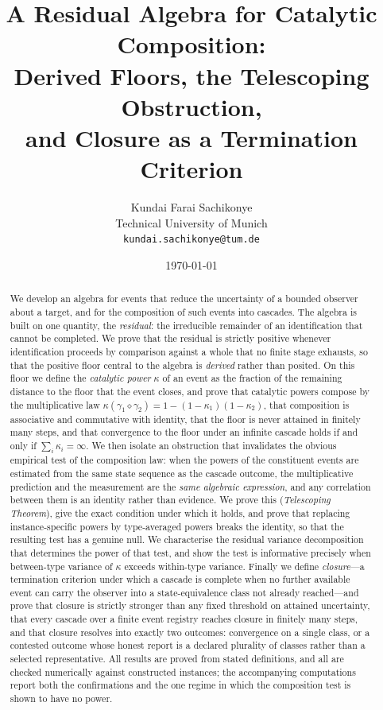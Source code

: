 \documentclass[11pt,a4paper]{article}
\title{\textbf{A Residual Algebra for Catalytic Composition:\\[2pt]
Derived Floors, the Telescoping Obstruction,\\
and Closure as a Termination Criterion}}
\author{%
Kundai Farai Sachikonye\\
\small Technical University of Munich\\
\small \texttt{kundai.sachikonye@tum.de}}
\date{\today}
\theoremstyle{thmstyle}
\theoremstyle{definition}
\theoremstyle{remark}
\newcommand{\kap}{\kappa}
\newcommand{\comp}{\diamond}
\begin{document}
\maketitle

\begin{abstract}
\noindent
We develop an algebra for events that reduce the uncertainty of a bounded
observer about a target, and for the composition of such events into
cascades. The algebra is built on one quantity, the \emph{residual}: the
irreducible remainder of an identification that cannot be completed. We
prove that the residual is strictly positive whenever identification proceeds
by comparison against a whole that no finite stage exhausts, so that the
positive floor central to the algebra is \emph{derived} rather than posited.
On this floor we define the \emph{catalytic power} $\kap$ of an event as the
fraction of the remaining distance to the floor that the event closes, and
prove that catalytic powers compose by the multiplicative law
$\kap(\gamma_1\comp\gamma_2)=1-(1-\kap_1)(1-\kap_2)$, that composition is
associative and commutative with identity, that the floor is never attained
in finitely many steps, and that convergence to the floor under an infinite
cascade holds if and only if $\sum_i\kap_i=\infty$. We then isolate an
obstruction that invalidates the obvious empirical test of the composition
law: when the powers of the constituent events are estimated from the same
state sequence as the cascade outcome, the multiplicative prediction and the
measurement are the \emph{same algebraic expression}, and any correlation
between them is an identity rather than evidence. We prove this
(\emph{Telescoping Theorem}), give the exact condition under which it holds,
and prove that replacing instance-specific powers by type-averaged powers
breaks the identity, so that the resulting test has a genuine null. We
characterise the residual variance decomposition that determines the power of
that test, and show the test is informative precisely when between-type
variance of $\kap$ exceeds within-type variance. Finally we define
\emph{closure}---a termination criterion under which a cascade is complete
when no further available event can carry the observer into a
state-equivalence class not already reached---and prove that closure is
strictly stronger than any fixed threshold on attained uncertainty, that
every cascade over a finite event registry reaches closure in finitely many
steps, and that closure resolves into exactly two outcomes: convergence on a
single class, or a contested outcome whose honest report is a declared
plurality of classes rather than a selected representative. All results are
proved from stated definitions, and all are checked numerically against
constructed instances; the accompanying computations report both the
confirmations and the one regime in which the composition test is shown to
have no power.
\end{abstract}
\end{document}
